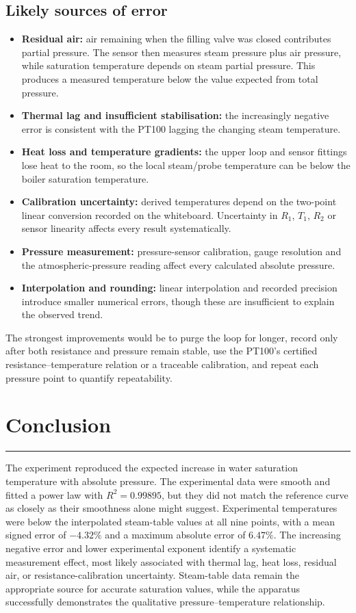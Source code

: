 \documentclass[11pt,a4paper]{article}
\newcommand{\sectionrule}{\vspace{-2pt}\color{rulegray}\hrule\color{black}\vspace{5pt}}
\begin{document}
\subsection{Likely sources of error}
\begin{itemize}
  \item \textbf{Residual air:} air remaining when the filling valve was closed
  contributes partial pressure. The sensor then measures steam pressure plus air
  pressure, while saturation temperature depends on steam partial pressure.
  This produces a measured temperature below the value expected from total pressure.
  \item \textbf{Thermal lag and insufficient stabilisation:} the increasingly
  negative error is consistent with the PT100 lagging the changing steam temperature.
  \item \textbf{Heat loss and temperature gradients:} the upper loop and sensor
  fittings lose heat to the room, so the local steam/probe temperature can be
  below the boiler saturation temperature.
  \item \textbf{Calibration uncertainty:} derived temperatures depend on the
  two-point linear conversion recorded on the whiteboard. Uncertainty in
  $R_1$, $T_1$, $R_2$ or sensor linearity affects every result systematically.
  \item \textbf{Pressure measurement:} pressure-sensor calibration, gauge
  resolution and the atmospheric-pressure reading affect every calculated
  absolute pressure.
  \item \textbf{Interpolation and rounding:} linear interpolation and recorded
  precision introduce smaller numerical errors, though these are insufficient
  to explain the observed trend.
\end{itemize}

The strongest improvements would be to purge the loop for longer, record only
after both resistance and pressure remain stable, use the PT100's certified
resistance--temperature relation or a traceable calibration, and repeat each
pressure point to quantify repeatability.

\section{Conclusion}
\sectionrule
The experiment reproduced the expected increase in water saturation temperature
with absolute pressure. The experimental data were smooth and fitted a power
law with $R^2=0.99895$, but they did not match the reference curve as closely as
their smoothness alone might suggest. Experimental temperatures were below the
interpolated steam-table values at all nine points, with a mean signed error of
$-4.32\%$ and a maximum absolute error of $6.47\%$. The increasing negative
error and lower experimental exponent identify a systematic measurement effect,
most likely associated with thermal lag, heat loss, residual air, or
resistance-calibration uncertainty. Steam-table data remain the appropriate
source for accurate saturation values, while the apparatus successfully
demonstrates the qualitative pressure--temperature relationship.
\end{document}
